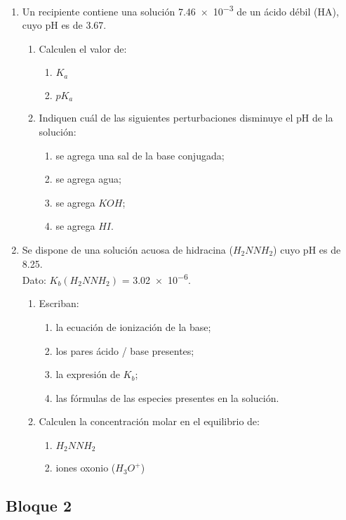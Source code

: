 \documentclass[../Práctica.root.tex]{subfiles}
\begin{document}
\begin{enumerate}
    \item[10.] Un recipiente contiene una solución \SI{7,46e-3}{\MR} de un ácido débil (HA), cuyo pH es de \num{3,67}.
          \begin{enumerate}
              \item Calculen el valor de:
                    \begin{enumerate}
                        \item $K_a$
                        \item $pK_a$
                    \end{enumerate}
              \item Indiquen cuál de las siguientes perturbaciones disminuye el pH de la solución:
                    \begin{enumerate}
                        \item se agrega una sal de la base conjugada;
                        \item se agrega agua;
                        \item se agrega $KOH$;
                        \item se agrega $HI$.
                    \end{enumerate}
          \end{enumerate}

    \item Se dispone de una solución acuosa de hidracina ($H_2NNH_2$) cuyo pH es de \num{8,25}. \\
          Dato: $K_b(H_2NNH_2)$ = \num{3,02e-6}.
          \begin{enumerate}
              \item Escriban:
                    \begin{enumerate}
                        \item la ecuación de ionización de la base;
                        \item los pares ácido / base presentes;
                        \item la expresión de $K_b$;
                        \item las fórmulas de las especies presentes en la solución.
                    \end{enumerate}
              \item Calculen la concentración molar en el equilibrio de:
                    \begin{enumerate}
                        \item $H_2NNH_2$
                        \item iones oxonio ($H_3O^+$)
                    \end{enumerate}
          \end{enumerate}
\end{enumerate}
\subsection{Bloque 2}%
\end{document}
